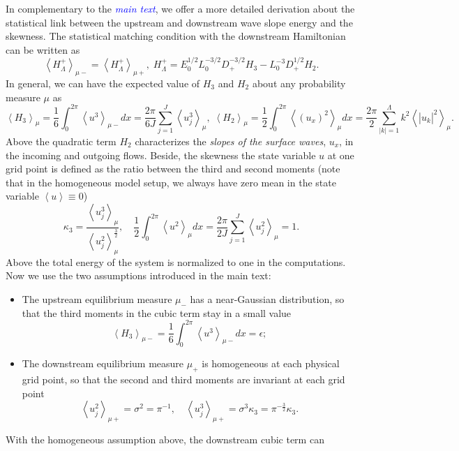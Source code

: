 \documentclass[9pt,twoside,lineno]{pnas-new}
\theoremstyle{plain}
\theoremstyle{plain}
\begin{document}
In complementary to the \textcolor{blue}{\emph{main text}}, we offer a more detailed
derivation about the statistical link between the upstream and downstream
wave slope energy and the skewness. The statistical matching condition
with the downstream Hamiltonian can be written as
\[
\left\langle H_{\Lambda}^{+}\right\rangle _{\mu-}=\left\langle H_{\Lambda}^{+}\right\rangle _{\mu+},\;H_{\Lambda}^{+}=E_{0}^{1/2}L_{0}^{-3/2}D_{+}^{-3/2}H_{3}-L_{0}^{-3}D_{+}^{1/2}H_{2}.
\]
In general, we can have the expected value of $H_{3}$ and $H_{2}$
about any probability measure $\mu$ as
\[
\left\langle H_{3}\right\rangle _{\mu}=\frac{1}{6}\int_{0}^{2\pi}\left\langle u^{3}\right\rangle _{\mu-}dx=\frac{2\pi}{6J}\sum_{j=1}^{J}\left\langle u_{j}^{3}\right\rangle _{\mu},\;\left\langle H_{2}\right\rangle _{\mu}=\frac{1}{2}\int_{0}^{2\pi}\left\langle \left(u_{x}\right)^{2}\right\rangle _{\mu}dx=\frac{2\pi}{2}\sum_{\left|k\right|=1}^{\Lambda}k^{2}\left\langle \left|\hat{u}_{k}\right|^{2}\right\rangle _{\mu}.
\]
Above the quadratic term $H_{2}$ characterizes the \emph{slopes of
the surface waves}, $u_{x}$, in the incoming and outgoing flows.
Beside, the skewness the state variable $u$ at one grid point is
defined as the ratio between the third and second moments (note that
in the homogeneous model setup, we always have zero mean in the state
variable $\left\langle u\right\rangle \equiv0$)
\[
\kappa_{3}=\frac{\left\langle u_{j}^{3}\right\rangle _{\mu}}{\left\langle u_{j}^{2}\right\rangle _{\mu}^{\frac{3}{2}}},\quad\frac{1}{2}\int_{0}^{2\pi}\left\langle u^{2}\right\rangle _{\mu}dx=\frac{2\pi}{2J}\sum_{j=1}^{J}\left\langle u_{j}^{2}\right\rangle _{\mu}=1.
\]
Above the total energy of the system is normalized to one in the computations.
Now we use the two assumptions introduced in the main text:
\begin{itemize}
\item The upstream equilibrium measure $\mu_{-}$ has a near-Gaussian distribution,
so that the third moments in the cubic term stay in a small value
\[
\left\langle H_{3}\right\rangle _{\mu-}=\frac{1}{6}\int_{0}^{2\pi}\left\langle u^{3}\right\rangle _{\mu-}dx=\epsilon;
\]
\item The downstream equilibrium measure $\mu_{+}$ is homogeneous at each
physical grid point, so that the second and third moments are invariant
at each grid point
\[
\left\langle u_{j}^{2}\right\rangle _{\mu+}=\sigma^{2}=\pi^{-1},\quad\left\langle u_{j}^{3}\right\rangle _{\mu+}=\sigma^{3}\kappa_{3}=\pi^{-\frac{3}{2}}\kappa_{3}.
\]
\end{itemize}
With the homogeneous assumption above, the downstream cubic term can
\end{document}
